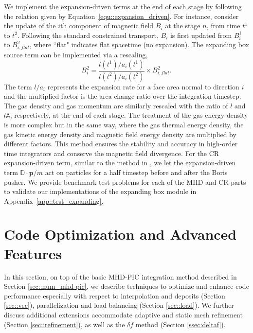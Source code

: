 \documentclass[fleqn,usenatbib]{mnras}
\begin{document}
We implement the expansion-driven terms at the end of each stage by following the relation given by Equation~\ref{equ::expansion_driven}. For instance, consider the update of the $i$th component of magnetic field $B_i$ at the stage $n$, from time $t^1$ to $t^2$. Following the standard constrained transport, $B_i$ is first updated from $B_i^{1}$ to $B_{i, flat}^{2}$, where ``flat" indicates flat spacetime (no expansion). The expanding box source term can be implemented via a rescaling,
\begin{equation*}
	B_i^{2} = \frac{l\left(t^{1} \right) / a_i \left(t^{1}\right)}{l\left(t^{2} \right) / a_i \left(t^{2}  \right)} \times B_{i, flat}^{2}.
\end{equation*}
The term $l/a_i$ represents the expansion rate for a face area normal to direction $i$ and the multiplied factor is the area change ratio over the integration timestep. The gas density and gas momentum are similarly rescaled with the ratio of $l$ and $l\mathbb{A}$, respectively, at the end of each stage. The treatment of the gas energy density is more complex but in the same way, where the gas thermal energy density, the gas kinetic energy density and magnetic field energy density are multiplied by different factors. This method ensures the stability and accuracy in high-order time integrators and conserve the magnetic field divergence. For the CR expansion-driven term, similar to the method in \cite{2015ApJ...800...88S}, we let the expansion-driven term $\mathbb{D} \cdot \boldsymbol{p} / m$ act on particles for a half timestep before and after the Boris pusher.
We provide benchmark test problems for each of the MHD and CR parts to validate our implementations of the expanding box module in Appendix~\ref{app::test_expanding}.

\section{Code Optimization and Advanced Features}

In this section, on top of the basic MHD-PIC integration method described in Section \ref{sec::num_mhd-pic}, we describe techniques to optimize and enhance code performance especially with respect to interpolation and deposits (Section \ref{sec::vec}), parallelization and load balancing (Section \ref{sec::load}). We further discuss additional extensions accommodate adaptive and static mesh refinement (Section \ref{sec::refinement}), as well as the $\delta f$ method (Section \ref{ssec:deltaf}).
\end{document}
